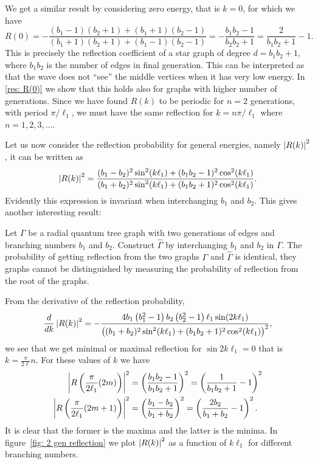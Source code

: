 We get a similar result by considering zero energy, that is $k=0$, for which we have
\[
  R(0) = -\frac{(b_1-1)(b_2+1)+(b_1+1)(b_2-1)}{(b_1+1)(b_2+1)+(b_1-1)(b_2-1)} = -\frac{b_1b_2-1}{b_2b_2+1} = \frac{2}{b_1b_2+1} - 1.
\]
This is precisely the reflection coefficient of a star graph of degree $d = b_1b_2 + 1$, where $b_1b_2$ is the number of edges in final generation. This can be interpreted as that the wave does not ``see'' the middle vertices when it has very low energy. In \cref{res: R(0)} we show that this holds also for graphs with higher number of generations. Since we have found $R(k)$ to be periodic for $n=2$ generations, with period $\pi/\ell_1$, we must have the same reflection for $k=n\pi/\ell_1$ where $n=1,2,3,\ldots$.

Let us now consider the reflection probability for general energies, namely $\left\lvert R(k)\right\rvert^2$, it can be written as
\begin{equation}\label{eq: 2 gen reflection probability}
  \left\lvert R(k)\right\rvert^2 = \frac{(b_1-b_2)^2 \sin ^2(k \ell_1)+(b_1 b_2-1)^2 \cos ^2(k \ell_1)}{(b_1+b_2)^2 \sin ^2(k \ell_1)+(b_1 b_2+1)^2 \cos ^2(k \ell_1)}.
\end{equation}
Evidently this expression is invariant when interchanging $b_1$ and $b_2$. This gives another interesting result:
\begin{theorem}\label{res: isoscattering graphs}
  Let $\Gamma$ be a radial quantum tree graph with two generations of edges and branching numbers $b_1$ and $b_2$. Construct $\widehat{\Gamma}$ by interchanging $b_1$ and $b_2$ in $\Gamma$. The probability of getting reflection from the two graphs $\Gamma$ and $\widehat{\Gamma}$ is identical, they graphs cannot be distinguished by measuring the probability of reflection from the root of the graphs.
\end{theorem}

From the derivative of the reflection probability,
\[
  \frac{d}{dk} \left\lvert R(k)\right\rvert^2 = -\frac{4 b_1 \left(b_1^2-1\right) b_2\left(b_2^2-1\right) \ell_1 \sin (2 k\ell_1)}{\left((b_1+b_2)^2 \sin ^2(k\ell_1)+(b_1 b_2+1)^2 \cos ^2(k\ell_1)\right)^2},
\]
we see that we get minimal or maximal reflection for $\sin 2k\ell_1 = 0$ that is $k = \frac{\pi}{2\ell}n$. For these values of $k$ we have
\begin{align}
  \left\lvert R\left(\frac{\pi}{2\ell_1}(2m)\right)\right\rvert^2 &=
  \left(\frac{b_1b_2-1}{b_1b_2+1}\right)^2 = \left(\frac{1}{b_1b_2+1} - 1\right)^2 \\
  \left\lvert R\left(\frac{\pi}{2\ell_1}(2m+1)\right)\right\rvert^2 &=
  \left(\frac{b_1-b_2}{b_1+b_2}\right)^2 = \left(\frac{2b_2}{b_1+b_2} - 1\right)^2. \label{eq: 2 gen reflection probability minimum}
\end{align}
It is clear that the former is the maxima and the latter is the minima. In figure~\ref{fig: 2 gen reflection} we plot $\left\lvert R(k)\right\rvert^2$ as a function of $k\ell_1$ for different branching numbers.

